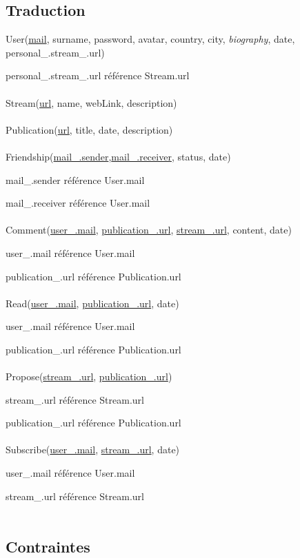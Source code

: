 \documentclass[a4paper,10pt]{article}
\begin{document}
\subsection{Traduction}

User(\underline {mail}, surname, password, avatar, country, city, \textit{biography},  date, personal\_.stream\_.url)

personal\_.stream\_.url référence Stream.url
\\\\
Stream(\underline {url}, name, webLink, description)
\\\\
Publication(\underline {url}, title, date, description)
\\\\
Friendship(\underline {mail\_.sender},\underline {mail\_.receiver}, status, date)

mail\_.sender référence User.mail 

mail\_.receiver référence User.mail
\\\\
Comment(\underline {user\_.mail}, \underline {publication\_.url}, \underline {stream\_.url}, content, date)

user\_.mail référence User.mail

publication\_.url référence Publication.url
\\\\
Read(\underline {user\_.mail}, \underline {publication\_.url}, date)

user\_.mail référence User.mail

publication\_.url référence Publication.url
\\\\
Propose(\underline {stream\_.url}, \underline {publication\_.url})

stream\_.url référence Stream.url

publication\_.url référence Publication.url
\\\\
Subscribe(\underline {user\_.mail}, \underline {stream\_.url}, date)

user\_.mail référence User.mail

stream\_.url référence Stream.url
\\\\

\subsection{Contraintes}
\end{document}
